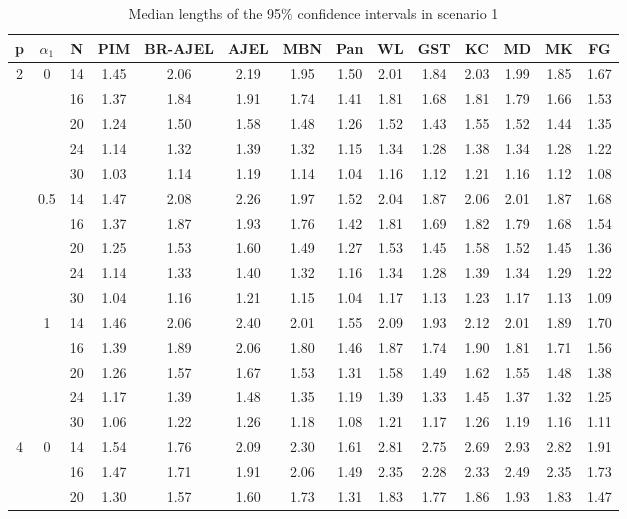 \documentclass[num-refs]{wiley-article}
\begin{document}
\begin{table}[htbp!]
\caption{Median lengths of the 95$\%$ confidence intervals in scenario 1}
\centering
\scriptsize
\begin{tabular}[t]{cccccccccccccc}
\hline
p & $\alpha_1$ & N & PIM & BR-AJEL & AJEL & MBN & Pan & WL & GST & KC & MD & MK & FG\\
\hline
2 & 0 & 14 & 1.45 & 2.06 & 2.19 & 1.95 & 1.50 & 2.01 & 1.84 & 2.03 & 1.99 & 1.85 & 1.67\\
& & 16 & 1.37 & 1.84 & 1.91 & 1.74 & 1.41 & 1.81 & 1.68 & 1.81 & 1.79 & 1.66 & 1.53\\
& & 20 & 1.24 & 1.50 & 1.58 & 1.48 & 1.26 & 1.52 & 1.43 & 1.55 & 1.52 & 1.44 & 1.35\\
& & 24 & 1.14 & 1.32 & 1.39 & 1.32 & 1.15 & 1.34 & 1.28 & 1.38 & 1.34 & 1.28 & 1.22\\
& & 30 & 1.03 & 1.14 & 1.19 & 1.14 & 1.04 & 1.16 & 1.12 & 1.21 & 1.16 & 1.12 & 1.08\\
\hline
 & 0.5 & 14 & 1.47 & 2.08 & 2.26 & 1.97 & 1.52 & 2.04 & 1.87 & 2.06 & 2.01 & 1.87 & 1.68\\
& & 16 & 1.37 & 1.87 & 1.93 & 1.76 & 1.42 & 1.81 & 1.69 & 1.82 & 1.79 & 1.68 & 1.54\\
& & 20 & 1.25 & 1.53 & 1.60 & 1.49 & 1.27 & 1.53 & 1.45 & 1.58 & 1.52 & 1.45 & 1.36\\
& & 24 & 1.14 & 1.33 & 1.40 & 1.32 & 1.16 & 1.34 & 1.28 & 1.39 & 1.34 & 1.29 & 1.22\\
& & 30 & 1.04 & 1.16 & 1.21 & 1.15 & 1.04 & 1.17 & 1.13 & 1.23 & 1.17 & 1.13 & 1.09\\
\hline
& 1 & 14 & 1.46 & 2.06 & 2.40 & 2.01 & 1.55 & 2.09 & 1.93 & 2.12 & 2.01 & 1.89 & 1.70\\
& & 16 & 1.39 & 1.89 & 2.06 & 1.80 & 1.46 & 1.87 & 1.74 & 1.90 & 1.81 & 1.71 & 1.56\\
& & 20 & 1.26 & 1.57 & 1.67 & 1.53 & 1.31 & 1.58 & 1.49 & 1.62 & 1.55 & 1.48 & 1.38\\
& & 24 & 1.17 & 1.39 & 1.48 & 1.35 & 1.19 & 1.39 & 1.33 & 1.45 & 1.37 & 1.32 & 1.25\\
& & 30 & 1.06 & 1.22 & 1.26 & 1.18 & 1.08 & 1.21 & 1.17 & 1.26 & 1.19 & 1.16 & 1.11\\
\hline
4 & 0 & 14 & 1.54 & 1.76 & 2.09 & 2.30 & 1.61 & 2.81 & 2.75 & 2.69 & 2.93 & 2.82 & 1.91\\
& & 16 & 1.47 & 1.71 & 1.91 & 2.06 & 1.49 & 2.35 & 2.28 & 2.33 & 2.49 & 2.35 & 1.73\\
& & 20 & 1.30 & 1.57 & 1.60 & 1.73 & 1.31 & 1.83 & 1.77 & 1.86 & 1.93 & 1.83 & 1.47\\

\end{tabular}
\end{table}
\end{document}
